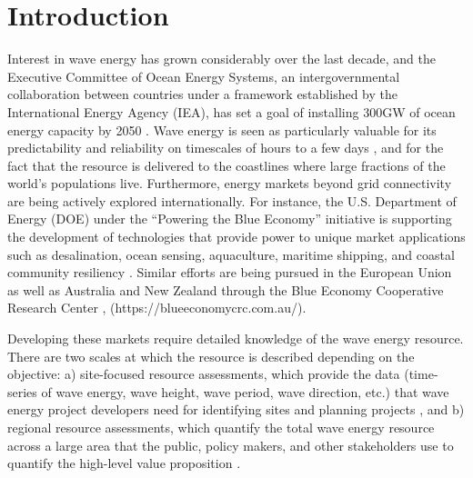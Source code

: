 \section{Introduction}

Interest in wave energy has grown considerably over the last decade, and the Executive Committee of Ocean Energy Systems, an intergovernmental collaboration between countries under a framework established by the International Energy Agency (IEA), has set a goal of installing 300GW of ocean energy capacity by 2050 \citep[]{babaritOceanWaveEnergy2017,huckerbyInternationalVisionOcean2017}. Wave energy is seen as particularly valuable for its predictability and reliability on timescales of hours to a few days \citep{parkinsonIntegratingOceanWave2015}, and for the fact that the resource is delivered to the coastlines where large fractions of the world's populations live. Furthermore, energy markets beyond grid connectivity are being actively explored internationally. For instance, the U.S. Department of Energy (DOE) under the ``Powering the Blue Economy'' initiative  is supporting the development of technologies that provide power to unique market applications such as desalination, ocean sensing, aquaculture, maritime shipping, and coastal community resiliency \citep{livecchiPoweringBlueEconomy2019}. Similar efforts are being pursued in the European Union as well as Australia and New Zealand through the Blue Economy Cooperative Research Center \citep{europeancommission2021EUBlueEconomy2021}, (https://blueeconomycrc.com.au/).

Developing these markets require detailed knowledge of the wave energy resource. There are two scales at which the resource is described depending on the objective: a) site-focused resource assessments, which provide the data (time-series of wave energy, wave height, wave period, wave direction, etc.) that wave energy project developers need for identifying sites and planning projects \citep[e.g., ][]{internationalelectrotechnicalcommissionPart101Wave2015, robertsonCharacterizingShoreWave2014, kumarWaveEnergyResource2015}, and b) regional resource assessments, which quantify the total wave energy resource across a large area that the public, policy makers, and other stakeholders use to quantify the high-level value proposition \citep[e.g., ][]{EPRIwaveresource2011, gunnQuantifyingGlobalWave2012, hemerRevisedAssessmentAustralia2017}.

